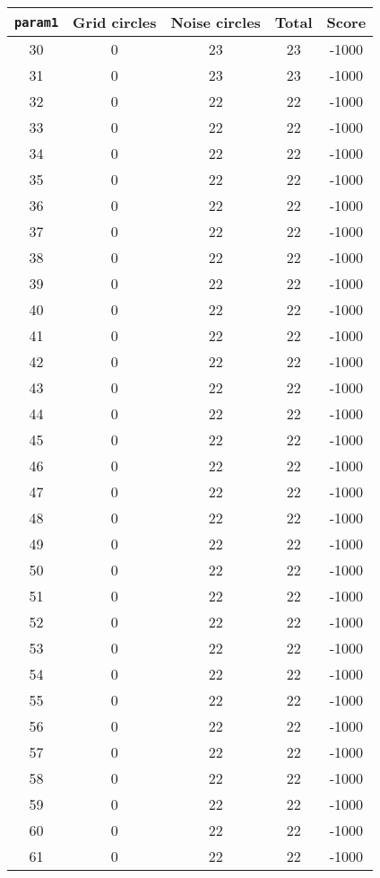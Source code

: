 \documentclass[letterpaper, 12pt]{article}
\begin{document}
\begin{longtable}{|c|c|c|c|c|}
\hline
\textbf{\texttt{param1}} & \textbf{Grid circles} & \textbf{Noise circles} & \textbf{Total} & \textbf{Score} \\
\hline
30 & 0 & 23 & 23 & -1000 \\
\hline
31 & 0 & 23 & 23 & -1000 \\
\hline
32 & 0 & 22 & 22 & -1000 \\
\hline
33 & 0 & 22 & 22 & -1000 \\
\hline
34 & 0 & 22 & 22 & -1000 \\
\hline
35 & 0 & 22 & 22 & -1000 \\
\hline
36 & 0 & 22 & 22 & -1000 \\
\hline
37 & 0 & 22 & 22 & -1000 \\
\hline
38 & 0 & 22 & 22 & -1000 \\
\hline
39 & 0 & 22 & 22 & -1000 \\
\hline
40 & 0 & 22 & 22 & -1000 \\
\hline
41 & 0 & 22 & 22 & -1000 \\
\hline
42 & 0 & 22 & 22 & -1000 \\
\hline
43 & 0 & 22 & 22 & -1000 \\
\hline
44 & 0 & 22 & 22 & -1000 \\
\hline
45 & 0 & 22 & 22 & -1000 \\
\hline
46 & 0 & 22 & 22 & -1000 \\
\hline
47 & 0 & 22 & 22 & -1000 \\
\hline
48 & 0 & 22 & 22 & -1000 \\
\hline
49 & 0 & 22 & 22 & -1000 \\
\hline
50 & 0 & 22 & 22 & -1000 \\
\hline
51 & 0 & 22 & 22 & -1000 \\
\hline
52 & 0 & 22 & 22 & -1000 \\
\hline
53 & 0 & 22 & 22 & -1000 \\
\hline
54 & 0 & 22 & 22 & -1000 \\
\hline
55 & 0 & 22 & 22 & -1000 \\
\hline
56 & 0 & 22 & 22 & -1000 \\
\hline
57 & 0 & 22 & 22 & -1000 \\
\hline
58 & 0 & 22 & 22 & -1000 \\
\hline
59 & 0 & 22 & 22 & -1000 \\
\hline
60 & 0 & 22 & 22 & -1000 \\
\hline
61 & 0 & 22 & 22 & -1000 \\

\end{longtable}
\end{document}
